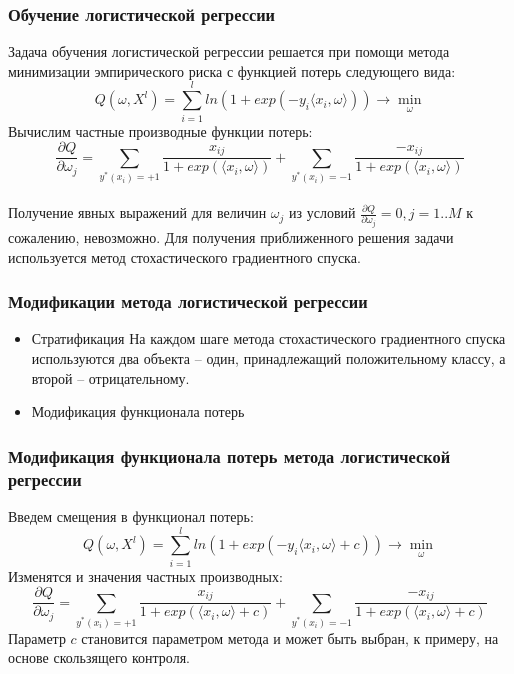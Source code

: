 \documentclass{beamer}
\begin{document}
\begin{frame}
\frametitle{Обучение логистической регрессии}
Задача обучения логистической регрессии решается при помощи метода минимизации эмпирического риска с функцией потерь следующего вида:
$$Q(\omega, X^l)=\sum\limits_{i=1}^l ln(1+exp(-y_i\langle x_i,\omega \rangle))\rightarrow \min\limits_{\omega}$$
Вычислим частные производные функции потерь:
$$\frac{\partial Q}{\partial \omega_j}=\sum\limits_{y^*(x_i)=+1}\frac{x_{ij}}{1+exp(\langle x_i,\omega\rangle)}+\sum\limits_{y^*(x_i)=-1}\frac{-x_{ij}}{1+exp(\langle x_i,\omega\rangle)}$$
\\Получение явных выражений для величин $\omega_j$ из условий $\frac{\partial Q}{\partial \omega_j}=0, j=1..M$ к сожалению, невозможно. Для получения приближенного решения задачи используется метод стохастического градиентного спуска.
\end{frame}

\begin{frame}
\frametitle{Модификации метода логистической регрессии}
\begin{itemize}
	\item{Стратификация\newline 
		На каждом шаге метода стохастического градиентного спуска используются два объекта – один,
		принадлежащий положительному классу, а второй – отрицательному.
	}
	\item{Модификация функционала потерь}
\end{itemize}
\end{frame}

\begin{frame}
\frametitle{Модификация функционала потерь метода логистической регрессии}
	Введем смещения в функционал потерь:
	$$Q(\omega, X^l)=\sum\limits_{i=1}^l ln(1+exp(-y_i\langle x_i,\omega \rangle +c))\rightarrow \min\limits_{\omega}$$
	Изменятся и значения частных производных:
	$$\frac{\partial Q}{\partial \omega_j}=\sum\limits_{y^*(x_i)=+1}\frac{x_{ij}}{1+exp(\langle x_i,\omega\rangle +c)}+\sum\limits_{y^*(x_i)=-1}\frac{-x_{ij}}{1+exp(\langle x_i,\omega\rangle +c)}$$
	Параметр $c$ становится параметром метода и может быть выбран, к примеру, на основе скользящего контроля.
\end{frame}
\end{document}
